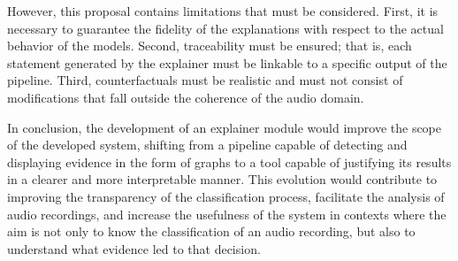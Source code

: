 However, this proposal contains limitations that must be considered. First, it is necessary to guarantee the fidelity of the explanations with respect to the actual behavior of the models. Second, traceability must be ensured; that is, each statement generated by the explainer must be linkable to a specific output of the pipeline. Third, counterfactuals must be realistic and must not consist of modifications that fall outside the coherence of the audio domain.

In conclusion, the development of an explainer module would improve the scope of the developed system, shifting from a pipeline capable of detecting and displaying evidence in the form of graphs to a tool capable of justifying its results in a clearer and more interpretable manner. This evolution would contribute to improving the transparency of the classification process, facilitate the analysis of audio recordings, and increase the usefulness of the system in contexts where the aim is not only to know the classification of an audio recording, but also to understand what evidence led to that decision.